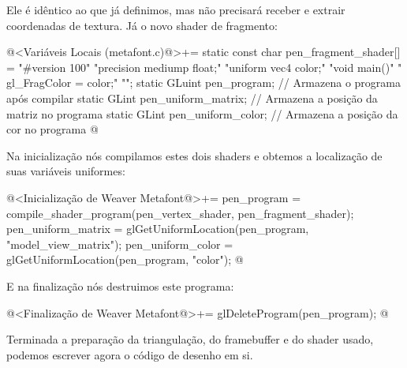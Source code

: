 {Ele é idêntico ao que já definimos, mas não precisará receber e
extrair coordenadas de textura. Já o novo shader de fragmento:

\iniciocodigo
@<Variáveis Locais (metafont.c)@>+=
static const char pen_fragment_shader[] =
  "#version 100\n"
  "precision mediump float;\n"
  "uniform vec4 color;\n"
  "void main(){\n"
  "  gl_FragColor = color;"
  "}\n";
static GLuint pen_program; // Armazena o programa após compilar
static GLint pen_uniform_matrix; // Armazena a posição da matriz no programa
static GLint pen_uniform_color; // Armazena a posição da cor no programa
@
\fimcodigo

Na inicialização nós compilamos estes dois shaders e obtemos a
localização de suas variáveis uniformes:

\iniciocodigo
@<Inicialização de Weaver Metafont@>+=
{
  pen_program = compile_shader_program(pen_vertex_shader, pen_fragment_shader);
  pen_uniform_matrix = glGetUniformLocation(pen_program, "model_view_matrix");
  pen_uniform_color = glGetUniformLocation(pen_program, "color");
}
@
\fimcodigo

E na finalização nós destruimos este programa:

\iniciocodigo
@<Finalização de Weaver Metafont@>+=
glDeleteProgram(pen_program);
@
\fimcodigo


Terminada a preparação da triangulação, do framebuffer e do shader
usado, podemos escrever agora o código de desenho em si.

}
